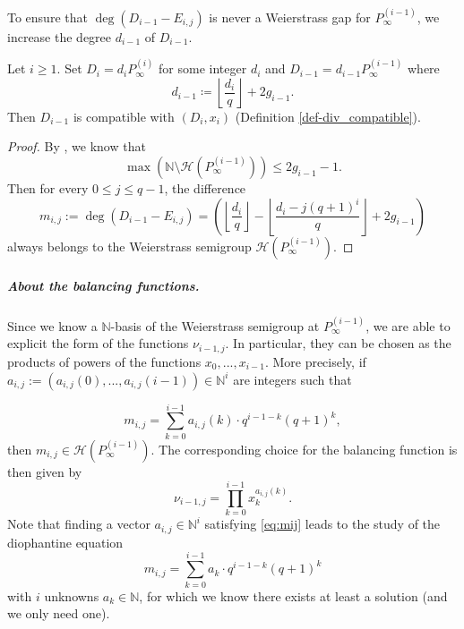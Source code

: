 \documentclass[10pt,a4paper]{article}
\newcommand\N{\mathbb{N}}
\newcommand\floor[1]{\left\lfloor #1 \right\rfloor}
\newcommand\calH{\mathcal{H}}
\newcommand\mydef{\coloneqq}
\newcommand{\cd}{\cdot}
\theoremstyle{plain}
\theoremstyle{plain}
\theoremstyle{definition}
\theoremstyle{remark}
\theoremstyle{plain}
\begin{document}
To ensure that 
$\deg(D_{i-1}-E_{i,j})$ is never a Weierstrass gap for $P_{\infty}^{(i-1)}$, we increase the degree $d_{i-1}$ of $D_{i-1}$. 

\begin{theorem}\label{th:div-comp-HT}
	Let $i \geq 1$. Set $D_i = d_i P^{(i)}_{\infty}$ for some integer $d_i$ and $D_{i-1} = d_{i-1} P^{(i-1)}_{\infty}$ where
	\begin{equation}\label{eq:deg_herm}
		d_{i-1} \mydef \floor{ \dfrac{d_i}{q}} + 2g_{i-1}.
	\end{equation}
	Then $D_{i-1}$ is compatible with $(D_i,x_i)$  (Definition \ref{def-div_compatible}).
\end{theorem}

\begin{proof}
	By \cite[Theorem 1.6.8]{S08}, we know that
	\[\max\left(\N \setminus \calH\left(P^{(i-1)}_{\infty}\right)\right) \leq 2g_{i-1} -1.\]
	Then for every $0 \leq j \leq q-1$, the difference
	\begin{equation}
		m_{i,j}:=\deg(D_{i-1}-E_{i,j}) =  \left(\left\lfloor \dfrac{d_i}{q} \right\rfloor - \left\lfloor \dfrac{d_i-j(q+1)^i}{q}\right\rfloor + 2g_{i-1} \right)
	\end{equation}
	always belongs to the Weierstrass semigroup $\mathcal{H}\left(P_{\infty}^{(i-1)}\right)$.
\end{proof}

\subparagraph*{About the balancing functions.}

Since we know a $\mathbb{N}$-basis of the Weierstrass semigroup at $P_{\infty}^{(i-1)}$, we are able to explicit the form of the functions $\nu_{i-1,j}$. In particular, they can be chosen as the products of powers of the functions $x_0,...,x_{i-1}$. More precisely, if $a_{i,j} := (a_{i,j}(0),...,a_{i,j}(i-1)) \in \mathbb{N}^i$ are integers such that

\begin{equation}\label{eq:mij}
	m_{i,j} = \sum\limits_{k=0}^{i-1} a_{i,j}(k) \cd q^{i-1-k}(q+1)^k,
\end{equation}
then $m_{i,j} \in \mathcal{H}\left(P_{\infty}^{(i-1)}\right)$. The corresponding choice for the balancing function is then given by 
\[ \nu_{i-1,j} = \prod\limits_{k=0}^{i-1} x_k^{a_{i,j}(k)}.\]
Note that finding a vector $a_{i,j} \in \mathbb{N}^i$ satisfying \eqref{eq:mij} leads to the study of the diophantine equation
\[m_{i,j} = \sum\limits_{k=0}^{i-1} a_k \cd q^{i-1-k}(q+1)^k\]
with $i$ unknowns $a_k \in \mathbb{N}$, for which we know there exists at least a solution (and we only need one).
\end{document}
